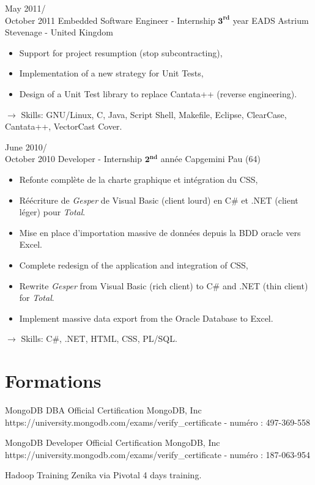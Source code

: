 \documentclass[11pt,a4paper]{moderncv}
\begin{document}
\cventry
{May 2011/\\October 2011}
{Embedded Software Engineer - Internship $\mathbf{3^{rd}}$ year}
{EADS Astrium}
{Stevenage - United Kingdom}
{}
{\begin{itemize}
\item Support for project resumption (stop subcontracting),
\item Implementation of a new strategy for Unit Tests,
\item Design of a Unit Test library to replace Cantata++ (reverse engineering).
\end{itemize}
$\rightarrow$ Skills: GNU/Linux, C, Java, Script Shell, Makefile, Eclipse, ClearCase, Cantata++, VectorCast Cover.
}   %

\cventry
{June 2010/\\October 2010}
{Developer - Internship $\mathbf{2^{nd}}$ année}
{Capgemini}
{Pau (64)}
{}
{\begin{itemize}
\item Refonte complète de la charte graphique et intégration du CSS,
\item Réécriture de \emph{Gesper} de Visual Basic (client lourd) en C\# et .NET (client léger) pour \emph{Total}.
\item Mise en place d'importation massive de données depuis la BDD oracle vers Excel.
\item Complete redesign of the application and integration of CSS,
\item Rewrite \emph{Gesper} from Visual Basic (rich client) to C\# and .NET (thin client) for \emph{Total}.
\item Implement massive data export from the Oracle Database to Excel.
\end{itemize}
$\rightarrow$ Skills: C\#, .NET, HTML, CSS, PL/SQL.
}   %


\section{Formations}

{MongoDB DBA Official Certification}
{MongoDB, Inc}
{}
{}
{https://university.mongodb.com/exams/verify\_certificate - numéro : 497-369-558}

{MongoDB Developer Official Certification}
{MongoDB, Inc}
{}
{}
{https://university.mongodb.com/exams/verify\_certificate - numéro : 187-063-954}

{Hadoop Training}
{Zenika via Pivotal}
{}
{}
{4 days training.}
\end{document}
